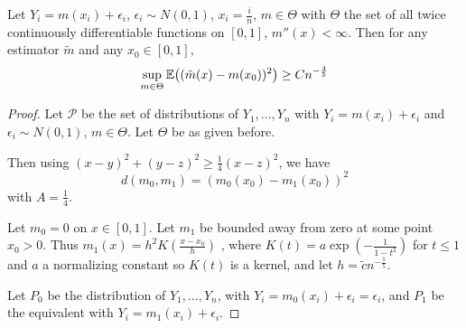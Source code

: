 \begin{thm}
  \label{defn:minimax_lower_bounds:1}
  Let $Y_{i} = m(x_{i}) + \epsilon_{i}$, $\epsilon_{i} \sim N(0, 1)$,
  $x_{i} = \frac{i}{n}$, $m \in \Theta$ with $\Theta$ the set of all
  twice continuously differentiable functions on $[0, 1]$, $m''(x) <
  \infty$.
  Then for any estimator $\tilde m$ and any $x_{0} \in [0, 1]$,
  \begin{equation}
    \label{eq:115}
    \sup_{m \in \Theta} \E{(\tilde m(x) - m(x_{0}))^{2}} \geq C n^{-\frac{4}{5}}
  \end{equation}
\end{thm}

\begin{proof}
  Let $\mathcal{P}$ be the set of distributions of $Y_{1}, \dots,
  Y_{n}$ with $Y_{i} = m(x_{i}) + \epsilon_{i}$ and $\epsilon_{i} \sim
  N(0, 1)$, $m \in \Theta$. Let $\Theta$ be as given before.

  Then using $(x - y)^{2} + (y - z)^{2} \geq \frac{1}{4} (x - z)^{2}$,
  we have
  \begin{equation}
    \label{eq:116}
    d(m_{0}, m_{1}) =  (m_{0}(x_{0}) - m_{1}(x_{0}))^{2}
  \end{equation} with $A = \frac{1}{4}$.

  Let $m_{0} = 0$ on $x \in [0, 1]$. Let $m_{1}$ be bounded away from
  zero at some point $x_{0} > 0$. Thus $m_{1}(x) = h^{2} K(\frac{x -
    x_{0}}{h})$ , where $K(t) = a \exp(- \frac{1}{1 - t^{2}})$ for $t
  \leq 1$ and $a$ a normalizing constant so $K(t)$ is a kernel, and
  let $h = \tilde c n^{-\frac{1}{5}}$.

  Let $P_{0}$ be the distribution of $Y_{1}, \dots, Y_{n}$, with
  $Y_{i} = m_{0}(x_{i}) + \epsilon_{i} = \epsilon_{i}$, and $P_{1}$ be
  the equivalent with $Y_{i} = m_{1}(x_{i}) + \epsilon_{i}$.


\end{proof}
